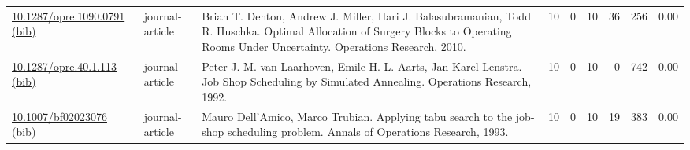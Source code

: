 {\begin{longtable}{p{5cm}lp{11cm}rrrrrr}
\href{http://dx.doi.org/10.1287/opre.1090.0791}{10.1287/opre.1090.0791} \href{https://www.doi2bib.org/bib/10.1287/opre.1090.0791}{(bib)} & journal-article & Brian T. Denton, Andrew J. Miller, Hari J. Balasubramanian, Todd R. Huschka. Optimal Allocation of Surgery Blocks to Operating Rooms Under Uncertainty. Operations Research, 2010. & 10 & 0 & 10 & 36 & 256 &  0.00\\
\href{http://dx.doi.org/10.1287/opre.40.1.113}{10.1287/opre.40.1.113} \href{https://www.doi2bib.org/bib/10.1287/opre.40.1.113}{(bib)} & journal-article & Peter J. M. van Laarhoven, Emile H. L. Aarts, Jan Karel Lenstra. Job Shop Scheduling by Simulated Annealing. Operations Research, 1992. & 10 & 0 & 10 & 0 & 742 &  0.00\\
\href{http://dx.doi.org/10.1007/bf02023076}{10.1007/bf02023076} \href{https://www.doi2bib.org/bib/10.1007/bf02023076}{(bib)} & journal-article & Mauro Dell'Amico, Marco Trubian. Applying tabu search to the job-shop scheduling problem. Annals of Operations Research, 1993. & 10 & 0 & 10 & 19 & 383 &  0.00\\
\end{longtable}
}

